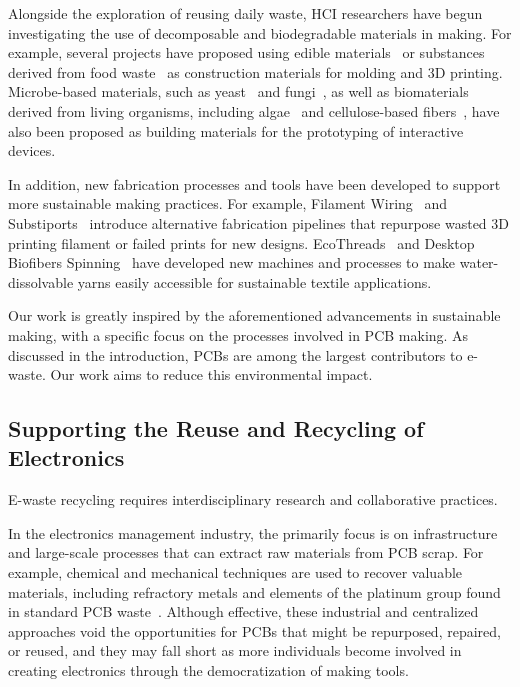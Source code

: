 Alongside the exploration of reusing daily waste, HCI researchers have begun investigating the use of decomposable and biodegradable materials in making. 
For example, several projects have proposed using edible materials~\cite{Backyard-Degradable_Wireless_Heating_Interface, Printable_Play-Dough} or substances derived from food waste~\cite{Coffee_Grounds} as construction materials for molding and 3D printing. 
Microbe-based materials, such as yeast~\cite{SCOBY} and fungi~\cite{Mycelium-based_Materials, Myco-Accessories}, as well as biomaterials derived from living organisms, including algae~\cite{Alganyl} and cellulose-based fibers~\cite{Cellulose-Based_Optical_Textile_Sensors, Bioplastics}, have also been proposed as building materials for the prototyping of interactive devices. 

In addition, new fabrication processes and tools have been developed to support more sustainable making practices. 
For example, Filament Wiring~\cite{deshpandeunmake} and Substiports~\cite{Substiports} introduce alternative fabrication pipelines that repurpose wasted 3D printing filament or failed prints for new designs. EcoThreads~\cite{ecothread} and Desktop Biofibers Spinning~\cite{spinning} have developed new machines and processes to make water-dissolvable yarns easily accessible for sustainable textile applications. 

Our work is greatly inspired by the aforementioned advancements in sustainable making, with a specific focus on the processes involved in PCB making. As discussed in the introduction, PCBs are among the largest contributors to e-waste. Our work aims to reduce this environmental impact.















\subsection{Supporting the Reuse and Recycling of Electronics}
E-waste recycling requires interdisciplinary research and collaborative practices.

In the electronics management industry, the primarily focus is on infrastructure and large-scale processes that can extract raw materials from PCB scrap. 
For example, chemical and mechanical techniques are used to recover valuable materials, including refractory metals and elements of the platinum group found in standard PCB waste~\cite{C8GC03688H, su131810357}. 
Although effective, these industrial and centralized approaches void the opportunities for PCBs that might be repurposed, repaired, or reused, and they may fall short as more individuals become involved in creating electronics through the democratization of making tools. 

